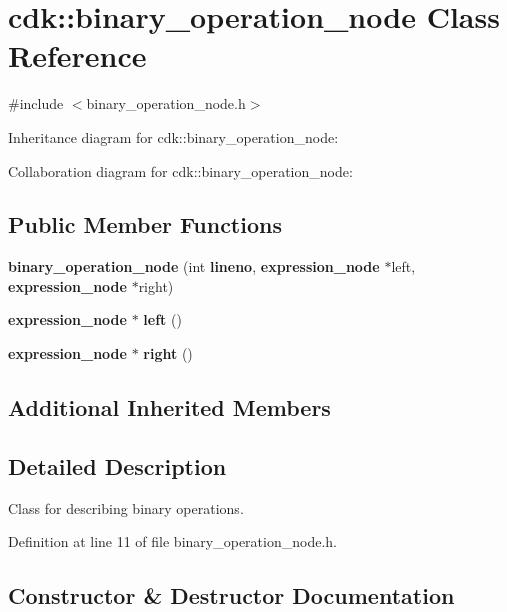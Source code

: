 \section{cdk\+:\+:binary\+\_\+operation\+\_\+node Class Reference}
\label{classcdk_1_1binary__operation__node}


{\ttfamily \#include $<$binary\+\_\+operation\+\_\+node.\+h$>$}



Inheritance diagram for cdk\+:\+:binary\+\_\+operation\+\_\+node\+:


Collaboration diagram for cdk\+:\+:binary\+\_\+operation\+\_\+node\+:
\subsection*{Public Member Functions}
\begin{DoxyCompactItemize}
\item 
\textbf{ binary\+\_\+operation\+\_\+node} (int \textbf{ lineno}, \textbf{ expression\+\_\+node} $\ast$left, \textbf{ expression\+\_\+node} $\ast$right)
\item 
\mbox{\label{classcdk_1_1binary__operation__node_a3adcd9aa9fc0a98577228eb275d1e913}} 
\textbf{ expression\+\_\+node} $\ast$ {\bfseries left} ()
\item 
\mbox{\label{classcdk_1_1binary__operation__node_ab06b2638a937686007d9dddf68f229e9}} 
\textbf{ expression\+\_\+node} $\ast$ {\bfseries right} ()
\end{DoxyCompactItemize}
\subsection*{Additional Inherited Members}


\subsection{Detailed Description}
Class for describing binary operations. 

Definition at line 11 of file binary\+\_\+operation\+\_\+node.\+h.



\subsection{Constructor \& Destructor Documentation}
\mbox{\label{classcdk_1_1binary__operation__node_ab860d60c2a90e677bdacc2eaf16a37f6}} 
